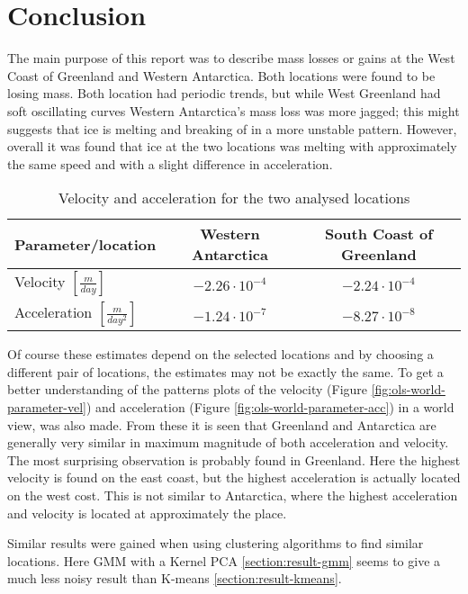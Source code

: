 \section{Conclusion}

The main purpose of this report was to describe mass losses or gains at the West Coast of Greenland and Western Antarctica.
Both locations were found to be losing mass.
Both location had periodic trends, but while West Greenland had soft oscillating curves Western Antarctica's mass loss was more jagged; this might suggests that ice is melting and breaking of in a more unstable pattern.
However, overall it was found that ice at the two locations was melting with approximately the same speed and with a slight difference in acceleration.

\begin{table}[H]
\centering
\begin{tabular}[H]{l | cc}
Parameter/location & Western Antarctica  & South Coast of Greenland \\ \hline
Velocity $\left[\frac{m}{day}\right]$ &  $-2.26 \cdot 10^{-4}$ & $-2.24 \cdot 10^{-4}$ \\
Acceleration $\left[\frac{m}{day^2}\right]$ &  $-1.24 \cdot 10^{-7}$ & $-8.27 \cdot 10^{-8}$ \\
\end{tabular}
\caption{Velocity and acceleration for the two analysed locations}
\end{table}

Of course these estimates depend on the selected locations and by choosing a different pair of locations, the estimates may not be exactly the same.
To get a better understanding of the patterns plots of the velocity (Figure \ref{fig:ols-world-parameter-vel}) and acceleration (Figure \ref{fig:ols-world-parameter-acc}) in a world view, was also made.
From these it is seen that Greenland and Antarctica are generally very similar in maximum magnitude of both acceleration and velocity. The most surprising observation is probably found in Greenland. Here the highest velocity is found on the east coast, but the highest acceleration is actually located on the west cost. This is not similar to Antarctica, where the highest acceleration and velocity is located at approximately the place.

Similar results were gained when using clustering algorithms to find similar locations. Here GMM with a Kernel PCA \ref{section:result-gmm} seems to give a much less noisy result than K-means \ref{section:result-kmeans}.

